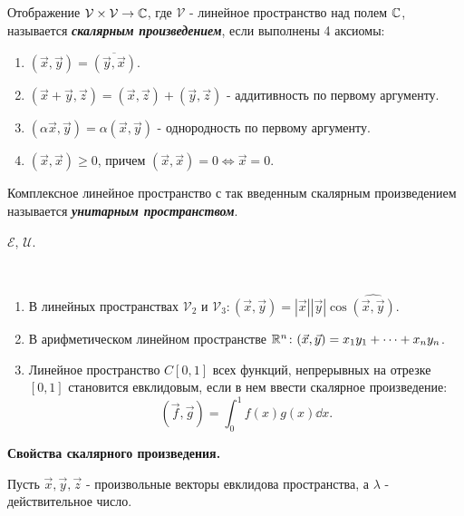 \begin{definition}
    Отображение $\mathcal{V} \times \mathcal{V} \to \mathbb{C}$, где $\mathcal{V}$ - линейное пространство над полем $\mathbb{C}$, называется \textbf{\textit{скалярным произведением}}, если выполнены 4 аксиомы:
    \begin{enumerate}[nosep]
        \item $(\vec{x}, \vec{y}) = \overline{(\vec{y}, \vec{x})}$.
        \item $(\vec{x} + \vec{y}, \vec{z}) = (\vec{x}, \vec{z}) + (\vec{y}, \vec{z})$ - аддитивность по первому аргументу.
        \item $(\alpha \vec{x}, \vec{y}) = \alpha(\vec{x}, \vec{y})$ - однородность по первому аргументу.
        \item $(\vec{x}, \vec{x}) \geq 0$, причем $(\vec{x}, \vec{x}) = 0 \iff \vec{x} = 0$.
    \end{enumerate}
\end{definition}

\begin{definition}
    Комплексное линейное пространство с так введенным скалярным произведением называется \textbf{\textit{унитарным пространством}}.
\end{definition}

\begin{designation}
    $\mathcal{E}$, $\mathcal{U}$.
\end{designation}

\begin{example}~
    \begin{enumerate}[nosep]
        \item В линейных пространствах $\mathcal{V}_2$ и $\mathcal{V}_3 \colon (\vec{x}, \vec{y}) = |\vec{x}||\vec{y}|\cos \widehat{(\vec{x}, \vec{y})}$.
        \item В арифметическом линейном пространстве $\mathbb{R}^n \colon (\vec{x}, \vec{y}) = x_1y_1 + \dots + x_ny_n$. 
        \item Линейное пространство $C[0, 1]$ всех функций, непрерывных на отрезке $[0, 1]$ становится евклидовым, если в нем ввести скалярное произведение:
        $$(\vec{f}, \vec{g}) = \int_{0}^{1} f(x)g(x) \dd x.$$
    \end{enumerate}
\end{example}

\textbf{Свойства скалярного произведения.}

Пусть $\vec{x}, \vec{y}, \vec{z}$ - произвольные векторы евклидова пространства, а $\lambda$ - действительное число.

